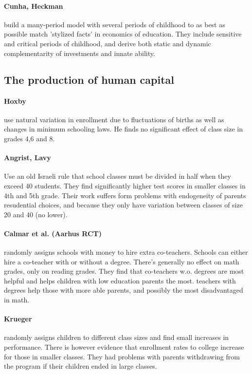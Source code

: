 \documentclass[12pt, a4paper]{article}
\begin{document}
\begin{multicols}{2}
\paragraph{Cunha, Heckman} build a many-period model with several periods of childhood to as best as possible match 'stylized facts' in economics of education. They include sensitive and critical periods of childhood, and derive both static and dynamic complementarity of investments and innate ability. 

\subsection{The production of human capital}
\paragraph{Hoxby} use natural variation in enrollment due to fluctuations of births as well as changes in minimum schooling laws. He finds no significant effect of class size in grades 4,6 and 8. 

\paragraph{Angrist, Lavy} Use an old Israeli rule that school classes must be divided in half when they exceed 40 students. They find significantly higher test scores in smaller classes in 4th and 5th grade. Their work suffers form problems with endogeneity of parents resudential choices, and because they only have variation between classes of size 20 and 40 (no lower). 

\paragraph{Calmar et al. (Aarhus RCT)} randomly assigns schools with money to hire extra co-teachers. Schools can either hire a co-teacher with or without a degree. There's generally no effect on math grades, only on reading grades. They find that co-teachers w.o. degrees are most helpful and helps children with low education parents the most. teachers with degrees help those with more able parents, and possibly the most disadvantaged in math.

\paragraph{Krueger} randomly assigns children to different class sizes and find small increases in performance. There is however evidence that enrollment rates to college increase for those in smaller classes. They had problems with parents withdrawing from the program if their children ended in large classes. 


\end{multicols}
\end{document}

